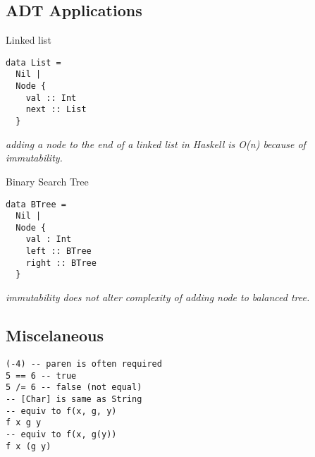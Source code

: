 \subsection*{ADT Applications}
Linked list
\begin{verbatim}
data List = 
  Nil | 
  Node {
    val :: Int
    next :: List
  }
\end{verbatim}
\textit{adding a node to the end of a linked list in Haskell is O(n) because of immutability.}

Binary Search Tree
\begin{verbatim}
data BTree =
  Nil |
  Node {
    val : Int
    left :: BTree
    right :: BTree
  }
\end{verbatim}
\textit{immutability does not alter complexity of adding node to balanced tree.}

\subsection*{Miscelaneous}
\begin{verbatim}
(-4) -- paren is often required
5 == 6 -- true
5 /= 6 -- false (not equal)
-- [Char] is same as String
-- equiv to f(x, g, y)
f x g y
-- equiv to f(x, g(y))
f x (g y)
\end{verbatim}
